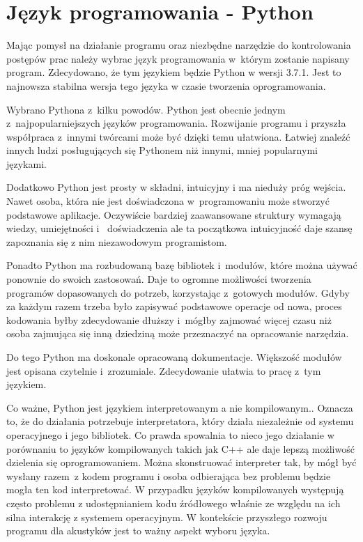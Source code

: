 \documentclass[eng,printmode]{mgr}
\begin{document}
\section{Język programowania - Python}\label{wybrany_jezyk}
Mając pomysł na działanie programu oraz niezbędne narzędzie do kontrolowania postępów prac należy wybrac język programowania w~którym zostanie napisany program. Zdecydowano, że tym językiem będzie Python w wersji 3.7.1. Jest to najnowsza stabilna wersja tego języka\cite{Python_latest_release} w czasie tworzenia oprogramowania.

Wybrano Pythona z~kilku powodów. Python jest obecnie jednym z~najpopularniejszych języków programowania\cite{Python_popular}. Rozwijanie programu i przyszła współpraca z~innymi twórcami może być dzięki temu ułatwiona. Łatwiej znaleźć innych ludzi posługujących się Pythonem niż innymi, mniej popularnymi językami. 

Dodatkowo Python jest prosty w składni, intuicyjny i ma nieduży próg wejścia. Nawet osoba, która nie jest doświadczona w~programowaniu może stworzyć podstawowe aplikacje. Oczywiście bardziej zaawansowane struktury wymagają wiedzy, umiejętności i~ doświadczenia ale ta początkowa intuicyjność daje szansę zapoznania się z nim niezawodowym programistom.

Ponadto Python ma rozbudowaną bazę bibliotek i~modułów, które można używać ponownie do swoich zastosowań.\cite{Pypie} Daje to ogromne możliwości tworzenia programów dopasowanych do potrzeb, korzystając z~gotowych modułów. Gdyby za każdym razem trzeba było zapisywać podstawowe operacje od nowa, proces kodowania byłby zdecydowanie dłuższy i~mógłby zajmować więcej czasu niż osoba zajmująca się inną dziedziną może przeznaczyć na opracowanie narzędzia. 

Do tego Python ma doskonale opracowaną dokumentacje. Większość modułów jest opisana czytelnie i~zrozumiale. Zdecydowanie ułatwia to pracę z~tym językiem. 

Co ważne, Python jest językiem interpretowanym a nie kompilowanym.\cite{Przewodnik_po_pythonie}. Oznacza to, że do działania potrzebuje interpretatora, który działa niezależnie od systemu operacyjnego i jego bibliotek. Co prawda spowalnia to nieco jego działanie w porównaniu to języków kompilowanych takich jak C++ ale daje lepszą możliwość dzielenia się oprogramowaniem. Można skonstruować interpreter tak, by mógł być wysłany razem~z kodem programu i osoba odbierająca bez problemu będzie mogła ten kod interpretować. W przypadku języków kompilowanych występują często problemu  z udostępnianiem kodu źródłowego właśnie ze względu na ich silna interakcję z systemem operacyjnym. W kontekście przyszłego rozwoju programu dla akustyków jest to ważny aspekt wyboru języka.
\end{document}
